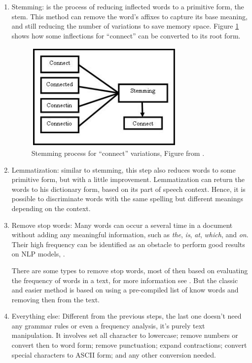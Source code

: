 	\begin{enumerate}
		\item Stemming: is the process of reducing inflected words to a primitive form, the stem. This method can remove the word's affixes to capture its base meaning, and still reducing the number of variations to save memory space. Figure \ref{fig:stemming} shows how some inflections for ``connect'' can be converted to its root form.
		
		\begin{figure}[h!]
			\centering
			\includegraphics[width=0.45\linewidth]{01.Chapters/02.Background/stemming}
			\caption{Stemming process for ``connect'' variations, Figure from  \cite{vijayarani2015preprocessing}.}
			\label{fig:stemming}
		\end{figure}
		
		
		\item Lemmatization: similar to stemming, this step also reduces words to some primitive form, but with a little improvement. Lemmatization can return the words to his dictionary form, based on its part of speech context. Hence, it is possible to discriminate words with the same spelling but different meanings depending on the context. 	
				
		\item Remove stop words:
		Many words can occur a several time in a document without adding any meaningful information, such as \textit{the}, \textit{is}, \textit{at}, \textit{which}, and \textit{on}. Their high frequency can be identified as an obstacle to perform good results on NLP models, \cite{kannan2014preprocessing}. 
		
		There are some types to remove stop words, most of then based on evaluating the frequency of words in a text, for more information see \cite{vijayarani2015preprocessing}. But the classic and easier method is based on using a pre-compiled list of know words and removing then from the text.
		
		\item Everything else:
		Different from the previous steps, the last one doesn't need any grammar rules or even a frequency analysis, it's purely text manipulation. It involves set all character to lowercase; remove numbers or convert then to word form; remove punctuation; expand contractions; convert special characters to ASCII form; and any other conversion needed.		 	
	\end{enumerate}
	
